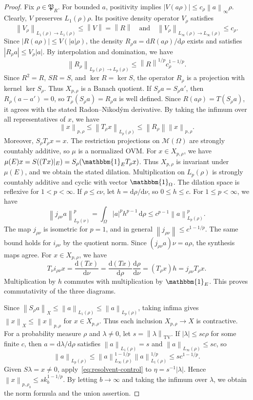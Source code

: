 \documentclass[11pt,leqno]{amsart}
\theoremstyle{compact}
\numberwithin{equation}{section}
\theoremstyle{compactremark}
\theoremstyle{compact}
\newcommand{\1}{\mathbbm{1}}
\newcommand{\rmd}{\mathrm{d}}
\newcommand{\norm}[1]{\left\|#1\right\|}
\newcommand{\abs}[1]{\left|#1\right|}
\begin{document}
\begin{proof}
Fix $\rho\in\mathfrak P_R$. For bounded $a$, positivity implies $\abs{V(a\rho)}\leq c_\rho\norm{a}_\infty\rho$. Clearly, $V$ preserves $L_1(\rho)\rho$. Its positive density operator $V_\rho$ satisfies
\[
\norm{V_\rho}_{L_1(\rho)\to L_1(\rho)}\leq\norm{V}=\norm{R}\quad\text{and}\quad\norm{V_\rho}_{L_\infty(\rho)\to L_\infty(\rho)}\leq c_\rho.
\]
Since $\abs{R(a\rho)}\leq V(\abs{a}\rho)$, the density $R_\rho a=\rmd R(a\rho)/\rmd\rho$ exists and satisfies $\abs{R_\rho a}\leq V_\rho\abs{a}$. By interpolation and domination, we have
\begin{equation}\label{eq:measure-density-bound}
\norm{R_\rho}_{L_p(\rho)\to L_p(\rho)}\leq\norm{R}^{1/p}c_\rho^{1-1/p}.
\end{equation}
Since $R^2=R$, $SR=S$, and $\ker R=\ker S$, the operator $R_\rho$ is a projection with kernel $\ker S_\rho$. Thus $X_{p,\rho}$ is a Banach quotient. If $S_\rho a=S_\rho a'$, then $R_\rho(a-a')=0$, so $T_\rho(S_\rho a)=R_\rho a$ is well defined. Since $R(a\rho)=T(S_\rho a)$, it agrees with the stated Radon--Nikod\'ym derivative. By taking the infimum over all representatives of $x$, we have
\[
\norm{x}_{p,\rho}\leq\norm{T_\rho x}_{L_p(\rho)}
\leq\norm{R_\rho}\norm{x}_{p,\rho}.
\]
Moreover, $S_\rho T_\rho x=x$. The restriction projections on $\mathcal M(\Omega)$ are strongly countably additive, so $\mu$ is a normalized OVM. For $x\in X_{p,\rho}$, we have $\mu(E)x=S((Tx)|_E)=S_\rho(\1_ET_\rho x)$. Thus $X_{p,\rho}$ is invariant under $\mu(E)$, and we obtain the stated dilation. Multiplication on $L_p(\rho)$ is strongly countably additive and cyclic with vector $\1_\Omega$. The dilation space is reflexive for $1<p<\infty$. If $\rho\leq c\nu$, let $h=\rmd\rho/\rmd\nu$, so $0\leq h\leq c$. For $1\leq p<\infty$, we have
\[
\norm{j_{\rho\nu}a}_{L_p(\nu)}^p=\int_\Omega\abs{a}^ph^{p-1}\,\rmd\rho\leq c^{p-1}\norm{a}_{L_p(\rho)}^p.
\]
The map $j_{\rho\nu}$ is isometric for $p=1$, and in general $\norm{j_{\rho\nu}}\leq c^{1-1/p}$. The same bound holds for $i_{\rho\nu}$ by the quotient norm. Since $(j_{\rho\nu}a)\nu=a\rho$, the synthesis maps agree. For $x\in X_{p,\rho}$, we have
\[
T_\nu i_{\rho\nu}x=\frac{\rmd(Tx)}{\rmd\nu}=\frac{\rmd(Tx)}{\rmd\rho}\frac{\rmd\rho}{\rmd\nu}=(T_\rho x)h=j_{\rho\nu}T_\rho x.
\]
Multiplication by $h$ commutes with multiplication by $\1_E$. This proves commutativity of the three diagrams.

Since $\norm{S_\rho a}_X\leq\norm{a}_{L_1(\rho)}\leq\norm{a}_{L_p(\rho)}$, taking infima gives $\norm{x}_X\leq\norm{x}_{p,\rho}$ for $x\in X_{p,\rho}$. Thus each inclusion $X_{p,\rho}\to X$ is contractive.
\begingroup
For a probability measure $\rho$ and $\lambda\neq0$, let $s=\norm{\lambda}_{\mathrm{TV}}$. If $\abs{\lambda}\leq sc\rho$ for some finite $c$, then $a=\rmd\lambda/\rmd\rho$ satisfies $\norm{a}_{L_1(\rho)}=s$ and $\norm{a}_{L_\infty(\rho)}\leq sc$, so
\[
\norm{a}_{L_p(\rho)}\leq\norm{a}_{L_\infty(\rho)}^{1-1/p}\norm{a}_{L_1(\rho)}^{1/p}\leq sc^{1-1/p}.
\]
Given $S\lambda=x\neq0$, apply~\eqref{eq:resolvent-control} to $\eta=s^{-1}\abs{\lambda}$. Hence $\norm{x}_{p,\rho_b}\leq s k_b^{1-1/p}$. By letting $b\to\infty$ and taking the infimum over $\lambda$, we obtain the norm formula and the union assertion.


\end{proof}
\end{document}
